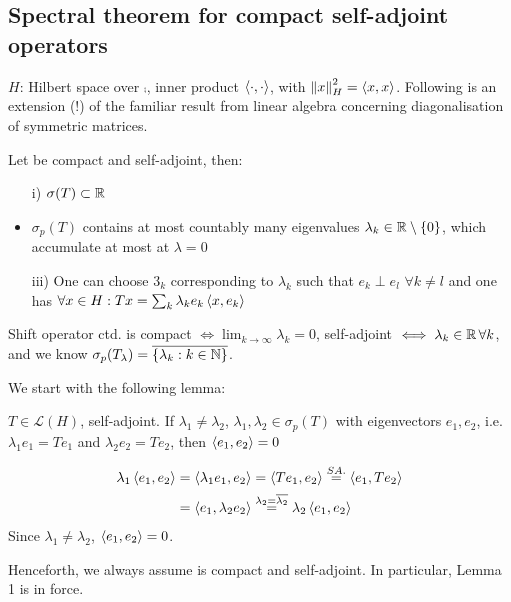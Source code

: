 \subsection{Spectral theorem for compact self-adjoint operators}
$H$: Hilbert space over $\comp$, inner product $\left<{\cdot},{\cdot}\right>$, with $\left\|{x}\right\|^2_H=\left<{x},{x}\right>$. Following is an extension (!) of the familiar result from linear algebra concerning diagonalisation of symmetric matrices.
\begin{theorem}\nl
	Let   be compact and self-adjoint, then:
	\begin{itemize}
		\item [i)] $\sigma(T)\subset\mathbb{R}$
		\item $\sigma_p(T)$ contains at most countably many eigenvalues $\lambda_k\in\mathbb{R}\setminus\{0\}$, which accumulate at most at $\lambda=0$
		\item [iii)] One can choose $3_k$  corresponding to $\lambda_k$ such that $e_k\perp e_l$ $\forall k\neq l$ and one has $\forall x\in H:Tx=\sum_k \lambda_k e_k\left<{x},{e_k}\right>$
	\end{itemize}
\end{theorem}
\begin{example}\nl
	Shift operator  ctd. is compact $\iff \lim_{k\to\infty}\lambda_k=0$, self-adjoint $\iff \lambda_k\in\mathbb{R}\,\forall k$, and we know $\sigma_p(T_\lambda)=\overline{\{\lambda_k:k\in\mathbb{N}\}}$.
\end{example}
We start with the following lemma:
\begin{lemma}[Lemma 1]
	$T\in\mathcal{L}(H)$, self-adjoint. If $\lambda_1\neq\lambda_2$, $\lambda_1,\lambda_2\in\sigma_p(T)$ with eigenvectors $e_1,e_2$, i.e. $\lambda_1 e_1=Te_1$ and $\lambda_2e_2=Te_2$, then $\left<{e_1},{e_2}\right>=0$
	\begin{pf}{}{}
		\begin{equation}
			\begin{split}
				\lambda_1\left<{e_1},{e_2}\right>&=\left<{\lambda_1e_1},{e_2}\right>=\left<{Te_1},{e_2}\right>\stackrel{SA.}{=}\left<{e_1},{Te_2}\right>\\
				&=\left<{e_1},{\lambda_2e_2}\right>\stackrel{\lambda_2=\overline{\lambda_2}}{=}\lambda_2\left<{e_1},{e_2}\right>
			\end{split}
		\end{equation}
		Since $\lambda_1\neq\lambda_2$, $\left<{e_1},{e_2}\right>=0$.
	\end{pf}
\end{lemma}
Henceforth, we always assume  is compact and self-adjoint. In particular, Lemma 1 is in force.\\
